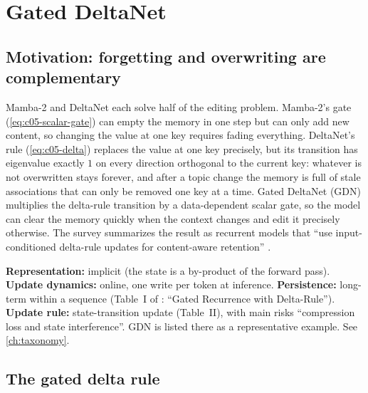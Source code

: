 \section{Gated DeltaNet}\label{sec:c05-gdn}

\subsection{Motivation: forgetting and overwriting are complementary}

Mamba-2 and DeltaNet each solve half of the editing problem. Mamba-2's gate
(\cref{eq:c05-scalar-gate}) can empty the memory in one step but can only add new content, so
changing the value at one key requires fading everything. DeltaNet's rule (\cref{eq:c05-delta})
replaces the value at one key precisely, but its transition has eigenvalue exactly $1$ on every
direction orthogonal to the current key: whatever is not overwritten stays forever, and after a
topic change the memory is full of stale associations that can only be removed one key at a
time. Gated DeltaNet (GDN) \citep{yang2025gdn} multiplies the delta-rule transition by a
data-dependent scalar gate, so the model can clear the memory quickly when the context changes
and edit it precisely otherwise. The survey summarizes the result as recurrent models that ``use
input-conditioned delta-rule updates for content-aware retention'' \citep{zhoubian2026memory}.

\begin{taxonomy}
\textbf{Representation:} implicit (the state is a by-product of the forward pass).
\textbf{Update dynamics:} online, one write per token at inference.
\textbf{Persistence:} long-term within a sequence (Table~I of \citet{zhoubian2026memory}:
``Gated Recurrence with Delta-Rule'').
\textbf{Update rule:} state-transition update (Table~II), with main risks ``compression loss and
state interference''. GDN is listed there as a representative example. See \cref{ch:taxonomy}.
\end{taxonomy}

\subsection{The gated delta rule}\label{sec:c05-gdn-rule}

